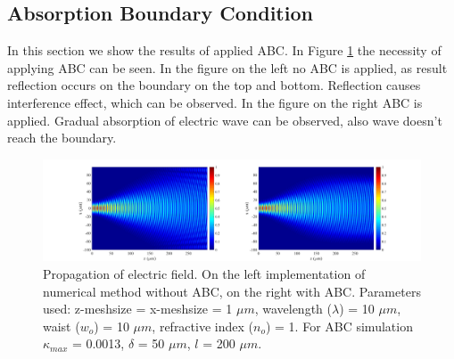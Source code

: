 \documentclass[a4paper]{article}
\begin{document}
	\subsection{Absorption Boundary Condition}
	In this section we show the results of applied ABC. In Figure \ref{fig:Absorption2} the necessity of applying ABC can be seen. In the figure on the left no ABC is applied, as result reflection occurs on the boundary on the top and bottom. Reflection causes interference effect, which can be observed. In the figure on the right ABC is applied. Gradual absorption of electric wave can be observed, also wave doesn't reach the boundary.
	
	\begin{figure}[h!]
		\hspace{-30mm}
		\includegraphics[width=1.5\textwidth]{N3.jpg}
		\caption{\label{fig:Absorption2}Propagation of electric field. On the left implementation of numerical method without ABC, on the right with ABC. Parameters used: z-meshsize = x-meshsize  = 1 $\mu m$, wavelength ($\lambda$) = 10 $\mu m$, waist ($w_o$) = 10 $\mu m$, refractive index ($n_o$) = 1. For ABC simulation $\kappa_{max}$ = 0.0013, $\delta$ =  50 $\mu m$, $l$ = 200 $\mu m$.}
	\end{figure}
\end{document}
